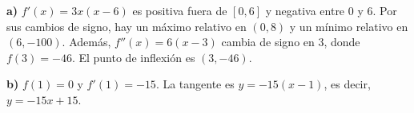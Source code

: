 \textbf{a)} $f'(x)=3x(x-6)$ es positiva fuera de $[0,6]$
y negativa entre $0$ y $6$. Por sus cambios de signo,
hay un máximo relativo en $\boxed{(0,8)}$ y un mínimo relativo
en $\boxed{(6,-100)}$. Además, $f''(x)=6(x-3)$ cambia de signo
en $3$, donde $f(3)=-46$. El punto de inflexión es $\boxed{(3,-46)}$.

\textbf{b)} $f(1)=0$ y $f'(1)=-15$. La tangente es
$y=-15(x-1)$, es decir, $\boxed{y=-15x+15}$.
